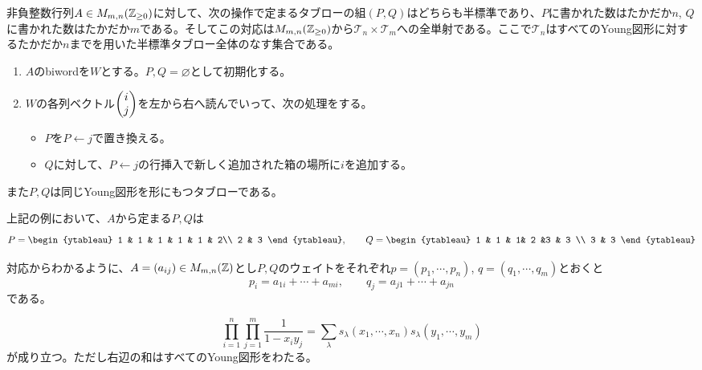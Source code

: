 \documentclass{ltjsreport}
\begin{document}
\begin{theo}[RSK対応]
  非負整数行列$A\in M_{m,n}(\mathbb{Z}_{\geq 0})$に対して、次の操作で定まるタブローの組$(P,Q)$はどちらも半標準であり、$P$に書かれた数はたかだか$n$, $Q$に書かれた数はたかだか$m$である。そしてこの対応は$M_{m,n}(\mathbb{Z}_{\geq 0})$から$\mathcal{T}_n\times \mathcal{T}_m$への全単射である。ここで$\mathcal{T}_n$はすべてのYoung図形に対するたかだか$n$までを用いた半標準タブロー全体のなす集合である。
  \begin{enumerate}
    \item $A$のbiwordを$W$とする。$P,Q=\varnothing$として初期化する。
    \item $W$の各列ベクトル$\begin{pmatrix} i\\j \end{pmatrix}$を左から右へ読んでいって、次の処理をする。
    \begin{itemize}
      \item $P$を$P\leftarrow j$で置き換える。
      \item $Q$に対して、$P\leftarrow j$の行挿入で新しく追加された箱の場所に$i$を追加する。
    \end{itemize}
  \end{enumerate}
  また$P,Q$は同じYoung図形を形にもつタブローである。
\end{theo}

\begin{eg}
  上記の例において、$A$から定まる$P,Q$は
  \[
  P=\begin{ytableau}
    1 & 1 & 1 & 1 & 1 & 2\\
    2 & 3
  \end{ytableau},\qquad
  Q=\begin{ytableau}
    1 & 1 & 1& 2 &3 & 3 \\
    3 & 3
  \end{ytableau}
  \]
\end{eg}

対応からわかるように、$A=(a_{ij})\in M_{m,n}(\mathbb{Z})$とし$P,Q$のウェイトをそれぞれ$p=(p_1,\cdots,p_n)$, $q=(q_1,\cdots,q_m)$とおくと
\begin{equation}\label{weight_and_matrix}
p_i=a_{1i}+\cdots+a_{mi},\qquad q_j=a_{j1}+\cdots+a_{jn}  
\end{equation}
である。

\begin{theo}[Cauchyの等式]
  \[
  \prod_{i=1}^n\prod_{j=1}^m\frac{1}{1-x_iy_j}=\sum_{\lambda}s_\lambda(x_1,\cdots,x_n)s_\lambda(y_1,\cdots,y_m)  
  \]
  が成り立つ。ただし右辺の和はすべてのYoung図形をわたる。
\end{theo}
\end{document}
